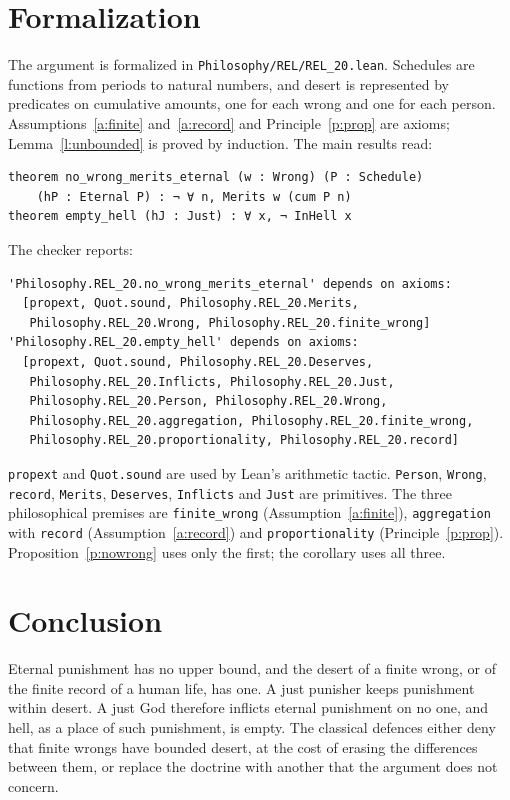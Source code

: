 \documentclass{situationist-preprint}
\begin{document}
\section{Formalization}

The argument is formalized in \nolinkurl{Philosophy/REL/REL_20.lean}. Schedules are functions from periods to natural numbers, and desert is represented by predicates on cumulative amounts, one for each wrong and one for each person. Assumptions~\ref{a:finite} and~\ref{a:record} and Principle~\ref{p:prop} are axioms; Lemma~\ref{l:unbounded} is proved by induction. The main results read:

\begin{lstlisting}
theorem no_wrong_merits_eternal (w : Wrong) (P : Schedule)
    (hP : Eternal P) : ¬ ∀ n, Merits w (cum P n)
theorem empty_hell (hJ : Just) : ∀ x, ¬ InHell x
\end{lstlisting}

The checker reports:

\begin{lstlisting}
'Philosophy.REL_20.no_wrong_merits_eternal' depends on axioms:
  [propext, Quot.sound, Philosophy.REL_20.Merits,
   Philosophy.REL_20.Wrong, Philosophy.REL_20.finite_wrong]
'Philosophy.REL_20.empty_hell' depends on axioms:
  [propext, Quot.sound, Philosophy.REL_20.Deserves,
   Philosophy.REL_20.Inflicts, Philosophy.REL_20.Just,
   Philosophy.REL_20.Person, Philosophy.REL_20.Wrong,
   Philosophy.REL_20.aggregation, Philosophy.REL_20.finite_wrong,
   Philosophy.REL_20.proportionality, Philosophy.REL_20.record]
\end{lstlisting}

\texttt{propext} and \texttt{Quot.sound} are used by Lean's arithmetic tactic. \texttt{Person}, \texttt{Wrong}, \texttt{record}, \texttt{Merits}, \texttt{Deserves}, \texttt{Inflicts} and \texttt{Just} are primitives. The three philosophical premises are \texttt{finite\_wrong} (Assumption~\ref{a:finite}), \texttt{aggregation} with \texttt{record} (Assumption~\ref{a:record}) and \texttt{proportionality} (Principle~\ref{p:prop}). Proposition~\ref{p:nowrong} uses only the first; the corollary uses all three.

\section{Conclusion}

Eternal punishment has no upper bound, and the desert of a finite wrong, or of the finite record of a human life, has one. A just punisher keeps punishment within desert. A just God therefore inflicts eternal punishment on no one, and hell, as a place of such punishment, is empty. The classical defences either deny that finite wrongs have bounded desert, at the cost of erasing the differences between them, or replace the doctrine with another that the argument does not concern.
\end{document}
